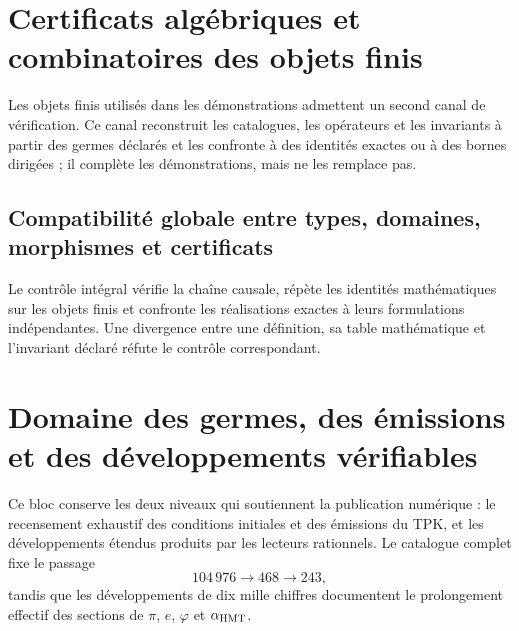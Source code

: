 
\chapter{Certificats algébriques et combinatoires des objets finis}
\label{app:infraestructura-reproducible-acumulativa}
\label{app:pruebas}

Les objets finis utilisés dans les démonstrations admettent un second canal
de vérification. Ce canal reconstruit les catalogues, les opérateurs et les invariants
à partir des germes déclarés et les confronte à des identités exactes ou à des bornes
dirigées ; il complète les démonstrations, mais ne les remplace pas.

\HMTDemoteHeadings

\HMTRestoreHeadings

\section{Compatibilité globale entre types, domaines, morphismes et certificats}
\label{sec:ejecucion-integral-acumulativa}

Le contrôle intégral vérifie la chaîne causale, répète les identités
mathématiques sur les objets finis et confronte les réalisations exactes à
leurs formulations indépendantes. Une divergence entre une définition, sa
table mathématique et l'invariant déclaré réfute le contrôle correspondant.





\chapter{Domaine des germes, des émissions et des développements vérifiables}
\label{app:semillas-emisiones-expansiones-acumulativas}

Ce bloc conserve les deux niveaux qui soutiennent la publication numérique :
le recensement exhaustif des conditions initiales et des émissions du TPK, et les
développements étendus produits par les lecteurs rationnels. Le catalogue
complet fixe le passage
\[
104\,976\longrightarrow468\longrightarrow243,
\]
tandis que les développements de dix mille chiffres documentent le prolongement
effectif des sections de \(\pi\), \(e\), \(\varphi\) et
\(\alpha_{\rm HMT}\).

